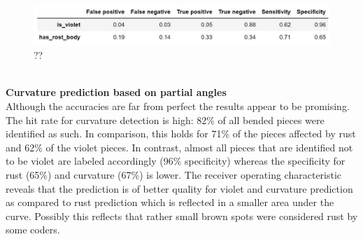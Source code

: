 \\
\begin{figure}[h]
	\centering
	\includegraphics[scale=0.6]{Figures/chapter04/fe_table}
	\decoRule
	\caption[??]{??}
	\label{fig:FeatureEngineeringTable}
\end{figure}

\\
\textbf{Curvature prediction based on partial angles} \\
Although the accuracies are far from perfect the results appear to be promising. The hit rate for curvature detection is high: 82\% of all bended pieces were identified as such. In comparison, this holds for 71\% of the pieces affected by rust and 62\% of the violet pieces. In contrast, almost all pieces that are identified not to be violet are labeled accordingly (96\% specificity) whereas the specificity for rust (65\%) and curvature (67\%) is lower. The receiver operating characteristic reveals that the prediction is of better quality for violet and curvature prediction as compared to rust prediction which is reflected in a smaller area under the curve. Possibly this reflects that rather small brown spots were considered rust by some coders. \\


